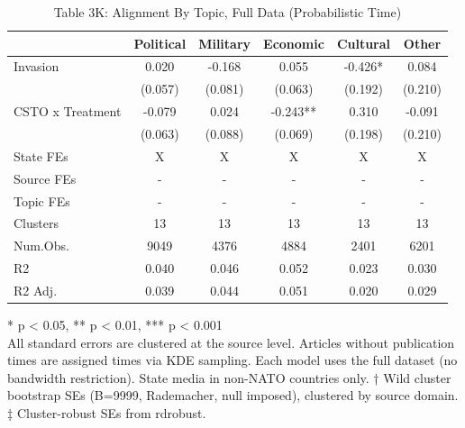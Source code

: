 \begin{table}[!t]
\caption{Table 3K: Alignment By Topic, Full Data (Probabilistic Time)} 
\fontsize{12.0pt}{14.4pt}\selectfont
\begin{tabular*}{\linewidth}{@{\extracolsep{\fill}}lccccc}
\toprule
  & Political & Military & Economic & Cultural & Other \\ 
\midrule\addlinespace[2.5pt]
Invasion & 0.020 & -0.168 & 0.055 & -0.426* & 0.084 \\ 
 & (0.057) & (0.081) & (0.063) & (0.192) & (0.210) \\ 
CSTO x Treatment & -0.079 & 0.024 & -0.243** & 0.310 & -0.091 \\ 
{} & {(0.063)} & {(0.088)} & {(0.069)} & {(0.198)} & {(0.210)} \\ 
State FEs & X & X & X & X & X \\ 
Source FEs & - & - & - & - & - \\ 
Topic FEs & - & - & - & - & - \\ 
Clusters & 13 & 13 & 13 & 13 & 13 \\ 
Num.Obs. & 9049 & 4376 & 4884 & 2401 & 6201 \\ 
R2 & 0.040 & 0.046 & 0.052 & 0.023 & 0.030 \\ 
R2 Adj. & 0.039 & 0.044 & 0.051 & 0.020 & 0.029 \\ 
\bottomrule
\end{tabular*}
\begin{minipage}{\linewidth}
* p < 0.05, ** p < 0.01, *** p < 0.001\\
All standard errors are clustered at the source level. Articles without
publication times are assigned times via KDE sampling. Each model uses the full
dataset (no bandwidth restriction). State media in non-NATO countries only.
† Wild cluster bootstrap SEs (B=9999, Rademacher, null imposed), clustered by
source domain. ‡ Cluster-robust SEs from rdrobust.\\
\end{minipage}
\end{table}

